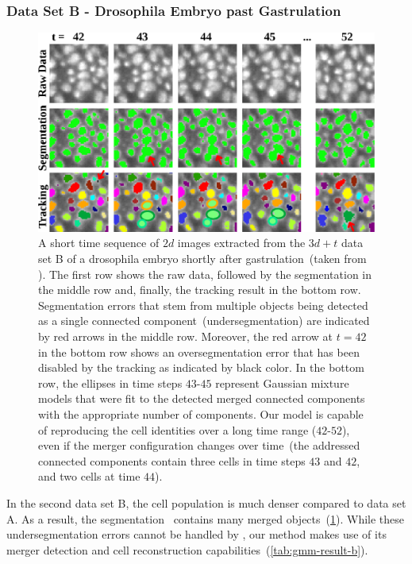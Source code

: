 \subsubsection{Data Set B - Drosophila Embryo past Gastrulation}
\begin{figure}
    \centering
    \includegraphics[width=\textwidth]{images/gmm/results/B/result_with_demerging.png}
    \caption[Excerpt of data set A: raw data, segmentation and tracking result]{A short time
        sequence of $2d$ images extracted from the $3d+t$ data set B of a drosophila embryo shortly
        after gastrulation~(taken from \citealp{schiegg_13_conservation}). The first row shows the raw
        data, followed by the segmentation in the middle row and, finally, the tracking result in
        the bottom row. Segmentation errors that stem from multiple objects being detected as a
        single connected component~(undersegmentation) are indicated by red arrows in the middle
        row. Moreover, the red arrow at $t=42$ in the bottom row shows an oversegmentation error that has been
        disabled by the tracking as indicated by black color. In the bottom row, the ellipses in
        time steps $43$-$45$ represent Gaussian mixture models that were fit to the detected merged
        connected components with the appropriate number of components. Our model is capable of
        reproducing the cell identities over a long time range ($42$-$52$), even if the merger
        configuration changes over time~(the addressed connected components contain three cells in
        time steps $43$ and $42$, and two cells at time $44$).}
    \label{fig:gmm-result-b}
\end{figure}
In the second data set B, the cell population is much denser compared to data set A. As a result,
the segmentation~\citep{sommer_11_ilastik} contains many merged
objects~(\cref{fig:gmm-result-b}). While these undersegmentation errors cannot be handled by
\citet{kausler_12_discrete}, our method makes use of its merger detection and cell reconstruction
capabilities~(\cref{tab:gmm-result-b}).

